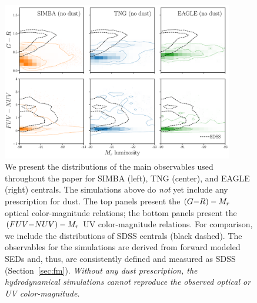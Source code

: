 \begin{figure}
\begin{center}
\includegraphics[width=0.9\textwidth]{figs/observables.pdf} 
    \caption{\label{fig:obs}
    We present the distributions of the main observables used throughout the
    paper for SIMBA (left), TNG (center), and EAGLE (right) centrals. The
    simulations above do {\em not} yet include any prescription for dust. The
    top panels present the $(G{-}R)-M_r$ optical color-magnitude relations; 
    the bottom panels present the $(FUV{-}NUV)-M_r$ UV color-magnitude relations. 
    For comparison, we include the distributions of SDSS centrals (black
    dashed). The observables for the simulations are derived from forward 
    modeled SEDs and, thus, are consistently defined and measured as SDSS 
    (Section~\ref{sec:fm}). {\em Without any dust prescription, the 
    hydrodynamical simulations cannot reproduce the observed optical or UV 
    color-magnitude.}
    }
\end{center}
\end{figure}
